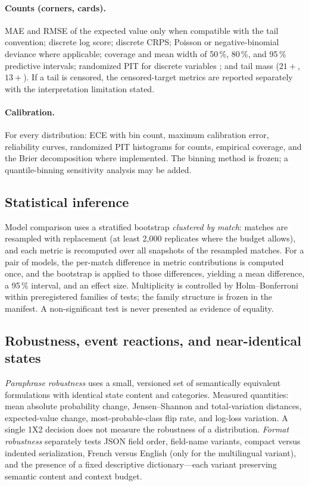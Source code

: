 \documentclass[11pt]{article}
\begin{document}
\paragraph{Counts (corners, cards).}
MAE and RMSE of the expected value only when compatible with the tail
convention; discrete log score; discrete CRPS; Poisson or negative-binomial
deviance where applicable; coverage and mean width of 50\,\%, 80\,\%, and
95\,\% predictive intervals; randomized PIT for discrete variables
\citep{czado2009}; and tail mass ($21+$, $13+$). If a tail is censored, the
censored-target metrics are reported separately with the interpretation
limitation stated.

\paragraph{Calibration.}
For every distribution: ECE with bin count, maximum calibration error,
reliability curves, randomized PIT histograms for counts, empirical coverage,
and the Brier decomposition where implemented. The binning method is frozen;
a quantile-binning sensitivity analysis may be added.

\subsection{Statistical inference}
\label{sec:inference}

Model comparison uses a stratified bootstrap \emph{clustered by match}:
matches are resampled with replacement (at least 2{,}000 replicates where the
budget allows), and each metric is recomputed over all snapshots of the
resampled matches. For a pair of models, the per-match difference in metric
contributions is computed once, and the bootstrap is applied to those
differences, yielding a mean difference, a 95\,\% interval, and an effect
size. Multiplicity is controlled by Holm--Bonferroni \citep{holm1979} within
preregistered families of tests; the family structure is frozen in the
manifest. A non-significant test is never presented as evidence of equality.

\subsection{Robustness, event reactions, and near-identical states}
\label{sec:robust}

\emph{Paraphrase robustness} uses a small, versioned set of semantically
equivalent formulations with identical state content and categories. Measured
quantities: mean absolute probability change, Jensen--Shannon and
total-variation distances, expected-value change, most-probable-class flip
rate, and log-loss variation. A single 1X2 decision does not measure the
robustness of a distribution. \emph{Format robustness} separately tests JSON
field order, field-name variants, compact versus indented serialization,
French versus English (only for the multilingual variant), and the presence
of a fixed descriptive dictionary---each variant preserving semantic content
and context budget.
\end{document}
